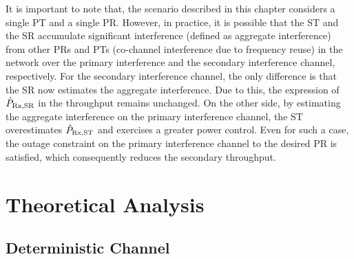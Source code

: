 \begin{remark}
\normalfont
It is important to note that, the scenario described in this chapter considers a single PT and a single PR. However, in practice, it is possible that the ST and the SR accumulate significant interference (defined as aggregate interference) from other PRs and PTs (co-channel interference due to frequency reuse) in the network\cite{Elsawy13_cmag,Kaushik14_P} over the primary interference and the secondary interference channel, respectively. For the secondary interference channel, the only difference is that the SR now estimates the aggregate interference. Due to this, the expression of $\hat{P}_{\text{Rx,SR}}$ in the throughput remains unchanged. On the other side, by estimating the aggregate interference on the primary interference channel, the ST overestimates $\hat{P}_{\text{Rx,ST}}$ and exercises a greater power control. Even for such a case, the outage constraint on the primary interference channel to the desired PR is satisfied, which consequently reduces the secondary throughput.  
\end{remark}
\section{Theoretical Analysis} \label{sec:th_ana}

\subsection{Deterministic Channel} \label{ssec:stpa}

